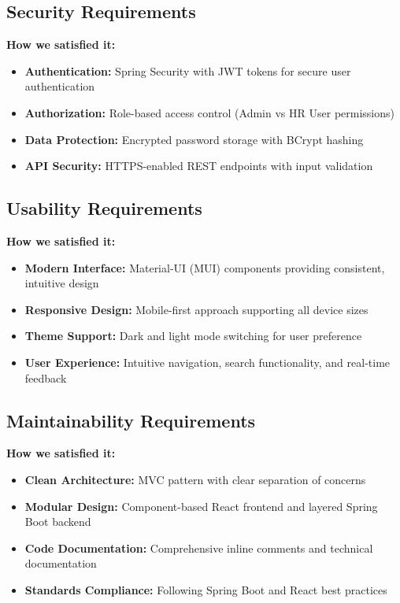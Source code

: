 \documentclass[a4paper,12pt]{report}
\begin{document}
\subsection{Security Requirements}
\textbf{How we satisfied it:}
\begin{itemize}
    \item \textbf{Authentication:} Spring Security with JWT tokens for secure user authentication
    \item \textbf{Authorization:} Role-based access control (Admin vs HR User permissions)
    \item \textbf{Data Protection:} Encrypted password storage with BCrypt hashing
    \item \textbf{API Security:} HTTPS-enabled REST endpoints with input validation
\end{itemize}

\subsection{Usability Requirements}
\textbf{How we satisfied it:}
\begin{itemize}
    \item \textbf{Modern Interface:} Material-UI (MUI) components providing consistent, intuitive design
    \item \textbf{Responsive Design:} Mobile-first approach supporting all device sizes
    \item \textbf{Theme Support:} Dark and light mode switching for user preference
    \item \textbf{User Experience:} Intuitive navigation, search functionality, and real-time feedback
\end{itemize}

\subsection{Maintainability Requirements}
\textbf{How we satisfied it:}
\begin{itemize}
    \item \textbf{Clean Architecture:} MVC pattern with clear separation of concerns
    \item \textbf{Modular Design:} Component-based React frontend and layered Spring Boot backend
    \item \textbf{Code Documentation:} Comprehensive inline comments and technical documentation
    \item \textbf{Standards Compliance:} Following Spring Boot and React best practices
\end{itemize}
\end{document}
